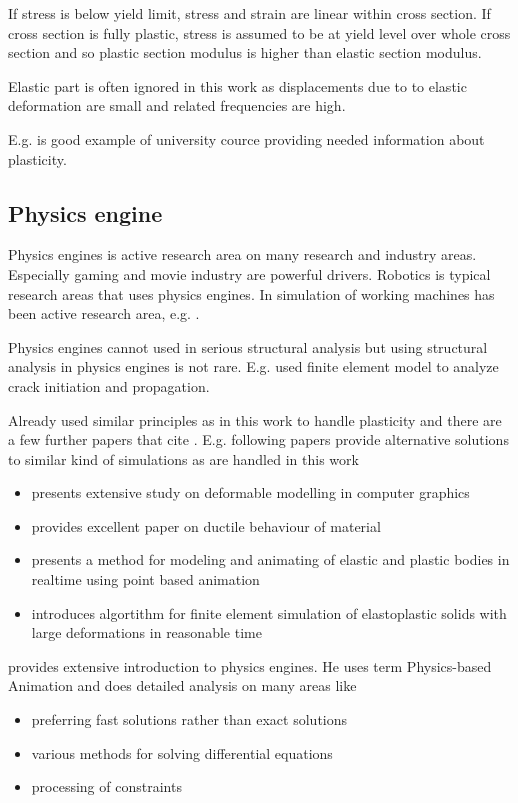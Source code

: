 If stress is below yield limit, stress and strain are linear within cross section.
If cross section is fully plastic, stress is assumed to be at yield level over whole cross section and 
so plastic section modulus is higher than elastic section modulus.

Elastic part is often ignored in this work as displacements due to to elastic deformation are small and 
related frequencies are high.

E.g. \cite{camp} is good example of university cource providing needed information about plasticity.

\subsection{Physics engine}

Physics engines is active research area on many research and industry areas.
Especially gaming and movie industry are powerful drivers.
Robotics is typical research areas that uses physics engines.
In \lut simulation of working machines has been active research area, e.g. \cite{moisio.thesis}.

Physics engines cannot used in serious structural analysis but using structural analysis in physics engines is not rare.  
E.g. \cite{Obrien:1999:GMA} used finite element model to analyze crack initiation and propagation.

Already \cite{cg1988} used similar principles as in this work to handle plasticity and there are a few further
papers that cite \cite{cg1988}. E.g. following papers provide alternative solutions to similar kind of simulations as 
are handled in this work 
\begin{itemize}
\item \cite{gibson1997survey} presents extensive study on deformable modelling in computer graphics
\item \cite{o2002graphical} provides excellent paper on ductile behaviour of material
\item \cite{muller2004point} presents a method for modeling and animating of 
elastic and plastic bodies in realtime using point based animation
\item \cite{irving2004invertible} introduces algortithm for  finite element simulation of elastoplastic solids with
large deformations in reasonable time 
\end{itemize}


\cite{erleben.thesis} provides extensive introduction to physics engines. 
He uses term Physics-based Animation and does detailed analysis on many areas like
\begin{itemize}
\item preferring fast solutions rather than exact solutions
\item various methods for solving differential equations
\item processing of constraints
\end{itemize}


